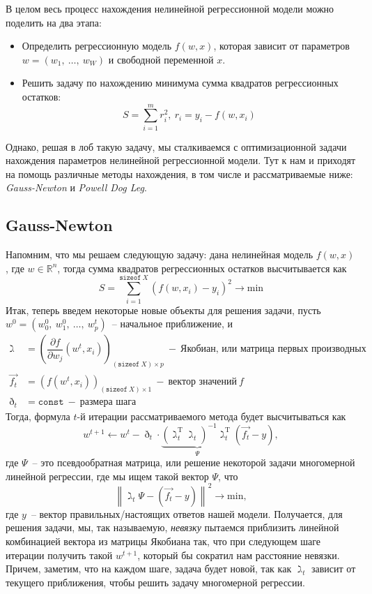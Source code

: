\documentclass[12pt, a4paper, oneside, final]{article}
\begin{document}
	В целом весь процесс нахождения нелинейной регрессионной модели можно поделить на два этапа:
	\begin{itemize}
		\item Определить регрессионную модель $f(w, x)$, которая зависит от параметров $w = (w_{1}, ~ \ldots, ~ w_{W})$ и свободной переменной $x$.
		\item Решить задачу по нахождению минимума сумма квадратов регрессионных остатков:
		\[
			S = \sum\limits_{i = 1}^{m}{r_{i}^{2}}, ~ r_{i} = y_{i} - f(w, x_{i})
		\]
	\end{itemize}
	Однако, решая в лоб такую задачу, мы сталкиваемся с оптимизационной задачи нахождения параметров нелинейной регрессионной модели.
	Тут к нам и приходят на помощь различные методы нахождения, в том числе и рассматриваемые ниже: \textit{Gauss-Newton} и \textit{Powell Dog Leg}.
	\subsection*{Gauss-Newton}
	Напомним, что мы решаем следующую задачу: дана нелинейная модель $f(w, x)$, где $w \in \mathbb{R}^{n}$, тогда сумма квадратов регрессионных остатков высчитывается как
	\[
		S = \sum\limits_{i = 1}^{\texttt{sizeof}~X}{(f(w, x_{i}) - y_{i})^2} \to \mathrm{min}
	\]
	Итак, теперь введем некоторые новые объекты для решения задачи, пусть $w^{0} = (w_{0}^{0}, ~ w_{1}^{0}, ~ \ldots, ~ w^{t}_{p})$~-- начальное приближение, и
	\begin{align*}
		\gimel &= \left(\dfrac{\partial{f}}{\partial{w_{j}}}{(w^{t}, x_{i})}\right)_{(\texttt{sizeof}~X) \times p}~-~\text{Якобиан, или матрица первых производных} \\
		\vec{f_{t}} &= \left(f(w^{t}, x_{i})\right)_{(\texttt{sizeof}~X) \times 1}~-~\text{вектор значений}~f \\
		\eth_{t} &= \texttt{const}~-~\text{размера шага}
	\end{align*}
	Тогда, формула $t$-й итерации рассматриваемого метода будет высчитываться как
	\[
		w^{t + 1} \gets w^{t} - \eth_{t} \cdot \underbrace{\left(\gimel^{\mathrm{T}}_{t}\gimel_{t}\right)^{-1}\gimel_{t}^{\mathrm{T}}}_{\Psi}(\vec{f_{t}} - y),
	\] где $\Psi$~-- это псевдообратная матрица, или решение некоторой задачи многомерной линейной регрессии, где мы ищем такой вектор $\Psi$, что
	\[
		\left\|\gimel_{t}\Psi - (\vec{f_{t}} - y)\right\|^{2} \to \mathrm{min},
	\] где $y$~-- вектор правильных/настоящих ответов нашей модели.
	Получается, для решения задачи, мы, так называемую, \textit{невязку} пытаемся приблизить линейной комбинацией вектора из матрицы Якобиана так, что при следующем шаге итерации получить такой $w^{t + 1}$, который бы сократил нам расстояние невязки.
	Причем, заметим, что на каждом шаге, задача будет новой, так как $\gimel_{t}$ зависит от текущего приближения, чтобы решить задачу многомерной регрессии.
\end{document}
